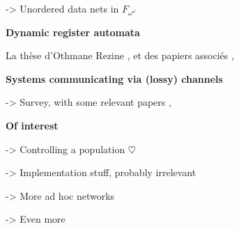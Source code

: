 	\cite{ROSAVELARDO201741} -> Unordered data nets in $F_{\omega^\omega}$
	
	\textbf{Dynamic register automata}
	
	La thèse d'Othmane Rezine \cite{Rezine2017verification}, et des papiers associés 
	\cite{AbdullaAKR2014verification},
	\cite{AbdullaAKR2015verification}
	
	\textbf{Systems communicating via (lossy) channels}
	
	\cite{Aiswarya2021network} -> Survey, with some relevant papers 	\cite{Aiswarya2015model},
	\cite{AbdullaAA2016data}
	
	\textbf{Of interest}
	
	\cite{BertrandDGGG2018controlling} -> Controlling a population $\heartsuit$
	
	\cite{baldoni2009implementing} -> Implementation stuff, probably irrelevant
	 	
	\cite{DelzannoSZ2011cliquesAdhoc} -> More ad hoc networks
	
	\cite{DBLP:journals/tcs/AbdullaDRST16} -> Even more
	

